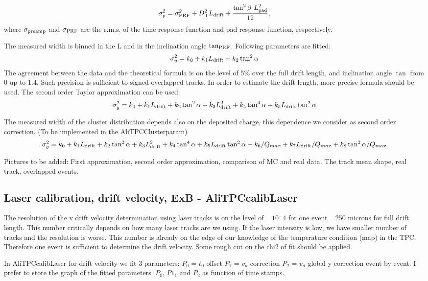 \documentclass[a4paper,12pt]{article}
\begin{document}
\begin{equation}
     \sigma_{\rm{p}}^2 = \sigma^2_{\rm{PRF}}+D{\rm{^2_T}}L_{\rm{drift}}+
        \frac{\tan^2\beta~L_{\rm{pad}}^2}{12},
\end{equation}
where ${\sigma_{\rm{preamp}}}$ and ${\sigma_{\rm{PRF}}}$  are the
r.m.s. of the time response function and  pad response function,
respectively.

The measured width is binned in the L and in the inclination angle   ${\tan_{\rm{PRF}}}$.
Following parameters are fitted:
\begin{equation}
     \sigma_y^2 = k_0+k_1L_{\rm{drift}}+k_2\tan^2\alpha
\end{equation}
The agreement between the data and the theoretical formula is on the level of 5\% over the full drift length,
and inclination angle $\tan$ from 0 up to 1.4. Such precision is sufficient to signed overlapped tracks.
In order to estimate the drift length, more precise formula should be used. The second order Taylor 
approximation can be used:
\begin{equation}
     \sigma_y^2 = k_0+k_1L_{\rm{drift}}+k_2\tan^2\alpha+k_3L^2_{\rm{drift}}+k_4\tan^4\alpha+k_5L_{\rm{drift}}\tan^2\alpha
\end{equation}

The measured width of the cluster distribution depends also on the deposited charge, this dependence we consider as second order correction. (To be implemented in the AliTPCClusterparam)
\begin{equation}
     \sigma_y^2 = k_0+k_1L_{\rm{drift}}+k_2\tan^2\alpha+k_3L^2_{\rm{drift}}+k_4\tan^4\alpha+ \\ 
k_5L_{\rm{drift}}\tan^2\alpha+k_6/Q_{max}+k_7L_{\rm{drift}}/Q_{max}+k_8\tan^2\alpha/Q_{max}
\end{equation}


Pictures to be added: 
First approximation, second order approximation, comparison of MC and real data. The track mean shape, real track, overlapped events.





\subsection{Laser calibration, drift velocity, ExB - AliTPCcalibLaser}


The resolution of the v drift velocity determination using laser tracks is on the level of ~ $10^-4$ for
one event ~ 250 microns for full drift length.  This number critically depends on how many laser tracks are we using. If the laser intensity is low, we have smaller number of tracks  and the resolution is worse.  This number is already on the edge of our knowledge of the temperature condition (map) in the TPC.   Therefore one event is sufficient to determine the drift velocity.
Some rough cut on the chi2 of fit should be applied.


In AliTPCcalibLaser for drift velocity we fit 3 parameters:
$P_0$ = $t_0$ offset
$P_1$ = $v_d$ correction
$P_2$ = $v_d$ global y  correction
event by event.
I prefer to store the graph of the fitted parameters.
$P_0$, $P1_1$ and $P_2$ as function of time stamps.
\end{document}
